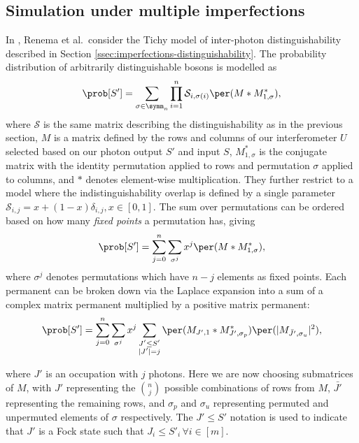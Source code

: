 \subsection{Simulation under multiple imperfections}
\label{sec:renema-review}

In \cite{renema2018, renema2018loss}, Renema et al.\ consider the Tichy model of inter-photon distinguishability described in Section \ref{ssec:imperfections-distinguishability}. 
The probability distribution of arbitrarily distinguishable bosons is modelled as
\begin{equation}
\prob[S'] = \sum_{\sigma\in\symm_n}\prod_{i=1}^n\mathcal{S}_{i,\sigma(i)}\per(M*M^*_{1,\sigma}) ,
\end{equation}
where $\mathcal{S}$ is the same matrix describing the distinguishability as in the previous section, $M$ is a matrix defined by the rows and columns of our interferometer $U$ selected based on our photon output $S'$ and input $S$, $M^*_{1,\sigma}$ is the conjugate matrix with the identity permutation applied to rows and permutation $\sigma$ applied to columns, and $*$ denotes element-wise multiplication. 
They further restrict to a model where the indistinguishability overlap is defined by a single parameter $\mathcal{S}_{i,j} = x + (1-x)\delta_{i,j}, x \in [0,1]$.
The sum over permutations can be ordered based on how many \emph{fixed points} a permutation has, giving
\begin{equation}
\prob[S'] = \sum_{j=0}^n\sum_{\sigma^j}x^j\per(M*M^*_{1,\sigma}) , \label{eqn:renema-state}
\end{equation}
where $\sigma^j$ denotes permutations which have $n-j$ elements as fixed points.
Each permanent can be broken down via the Laplace expansion into a sum of a complex matrix permanent multiplied by a positive matrix permanent:
\begin{equation}
\prob[S'] = \sum_{j=0}^n\sum_{\sigma^j}x^j\sum_{\substack{J'\leq S'\\|J'|=j}}\per(M_{J',1}*M^*_{J',\sigma_p})\per(|M_{\bar{J'},\sigma_u}|^2) ,
\end{equation}

\noindent where $J'$ is an occupation with $j$ photons. Here we are now choosing submatrices of $M$, with $J'$ representing the $\binom{n}{j}$ possible combinations of rows from $M$, $\bar{J'}$ representing the remaining rows, and $\sigma_p$ and $\sigma_u$  representing permuted and unpermuted elements of $\sigma$ respectively.
The $J' \leq S'$ notation is used to indicate that $J'$ is a Fock state such that $J_i\leq S'_i \,\forall i\in[m]$.

